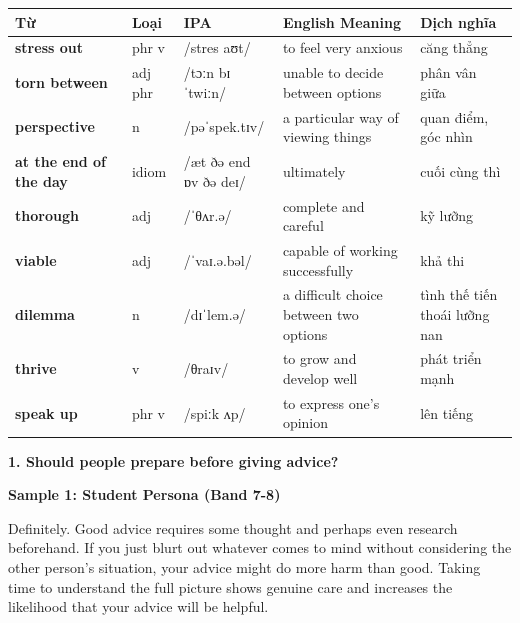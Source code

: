 \vspace{0.8em}
\begin{center}
\renewcommand{\arraystretch}{1.65}
\begin{tabularx}{\textwidth}{|V{0.22\textwidth}|C{0.07\textwidth}|I{0.20\textwidth}|Y|V{0.18\textwidth}|}
\hline
{}
\textbf{Từ} & \textbf{Loại} & \textbf{IPA} & \textbf{English Meaning} & \textbf{Dịch nghĩa} \\
\hline
\textbf{stress out} & phr v & /stres aʊt/ & to feel very anxious & căng thẳng \\ \hline
\textbf{torn between} & adj phr & /tɔːn bɪˈtwiːn/ & unable to decide between options & phân vân giữa \\ \hline
\textbf{perspective} & n & /pəˈspek.tɪv/ & a particular way of viewing things & quan điểm, góc nhìn \\ \hline
\textbf{at the end of the day} & idiom & /æt ðə end ɒv ðə deɪ/ & ultimately & cuối cùng thì \\ \hline
\textbf{thorough} & adj & /ˈθʌr.ə/ & complete and careful & kỹ lưỡng \\ \hline
\textbf{viable} & adj & /ˈvaɪ.ə.bəl/ & capable of working successfully & khả thi \\ \hline
\textbf{dilemma} & n & /dɪˈlem.ə/ & a difficult choice between two options & tình thế tiến thoái lưỡng nan \\ \hline
\textbf{thrive} & v & /θraɪv/ & to grow and develop well & phát triển mạnh \\ \hline
\textbf{speak up} & phr v & /spiːk ʌp/ & to express one's opinion & lên tiếng \\ \hline
\end{tabularx}
\end{center}

\partthreeheader

\begin{ieltsquestion}
\textbf{1. Should people prepare before giving advice?}
\end{ieltsquestion}
\textbf{Sample 1: Student Persona (Band 7-8)}

Definitely. Good advice requires some thought and perhaps even research beforehand. If you just blurt out whatever comes to mind without considering the other person's situation, your advice might do more harm than good. Taking time to understand the full picture shows genuine care and increases the likelihood that your advice will be helpful.

\separator

